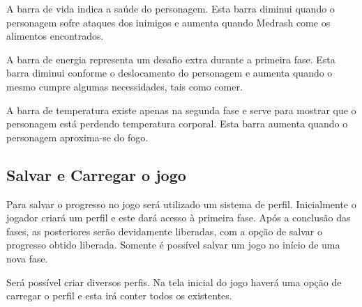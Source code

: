 A barra de vida indica a saúde do personagem. Esta barra diminui quando
o personagem sofre ataques dos inimigos e aumenta quando Medrash come os alimentos
encontrados.

A barra de energia representa um desafio extra durante a primeira fase. Esta
 barra diminui conforme o deslocamento do personagem e aumenta quando o 
mesmo cumpre algumas necessidades, tais como comer.

A barra de temperatura existe apenas na segunda fase e serve para mostrar que
o personagem está perdendo temperatura corporal. Esta barra aumenta quando o 
personagem aproxima-se do fogo.

\subsection {Salvar e Carregar o jogo}
Para salvar o progresso no jogo será utilizado um sistema de perfil. Inicialmente o jogador criará um perfil e este dará acesso à primeira fase. Após a conclusão das fases, as posteriores serão devidamente liberadas, com a opção de salvar o progresso obtido liberada. Somente é possível salvar um jogo no início de uma nova fase.

Será possível criar diversos perfis. Na tela inicial do jogo haverá uma opção de carregar o perfil e esta irá conter todos os existentes.